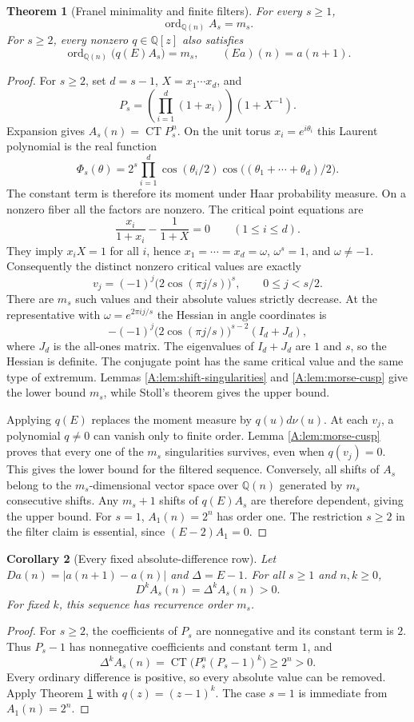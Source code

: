 \documentclass[11pt,a4paper]{article}
\newtheorem{theorem}{Theorem}[section]
\newtheorem{corollary}[theorem]{Corollary}
\theoremstyle{definition}
\theoremstyle{remark}
\numberwithin{equation}{section}
\DeclareMathOperator{\CT}{CT}
\newcommand{\Q}{\mathbb Q}\newcommand{\Z}{\mathbb Z}
\begin{document}
\begin{theorem}[Franel minimality and finite filters]\label{A:thm:franel-minimal}
For every $s\ge1$,
\[
 \operatorname{ord}_{\Q(n)} A_s=m_s.
\]
For $s\ge2$, every nonzero $q\in\Q[z]$ also satisfies
\[
 \operatorname{ord}_{\Q(n)}\bigl(q(E)A_s\bigr)=m_s,
 \qquad (Ea)(n)=a(n+1).
\]
\end{theorem}
\begin{proof}
For $s\ge2$, set $d=s-1$, $X=x_1\cdots x_d$, and
\[
 P_s=\left(\prod_{i=1}^d(1+x_i)\right)(1+X^{-1}).
\]
Expansion gives $A_s(n)=\CT P_s^n$. On the unit torus
$x_i=e^{i\theta_i}$ this Laurent polynomial is the real function
\[
 \Phi_s(\theta)=2^s\prod_{i=1}^d\cos(\theta_i/2)
     \cos\bigl((\theta_1+\cdots+\theta_d)/2\bigr).
\]
The constant term is therefore its moment under Haar probability
measure. On a nonzero fiber all the factors are nonzero. The critical
point equations are
\[
 \frac{x_i}{1+x_i}-\frac1{1+X}=0\qquad(1\le i\le d).
\]
They imply $x_iX=1$ for all $i$, hence
$x_1=\cdots=x_d=\omega$, $\omega^s=1$, and $\omega\ne-1$.
Consequently the distinct nonzero critical values are exactly
\[
 v_j=(-1)^j\bigl(2\cos(\pi j/s)\bigr)^s,
 \qquad 0\le j<s/2.
\]
There are $m_s$ such values and their absolute values strictly decrease.
At the representative with $\omega=e^{2\pi ij/s}$ the Hessian in
angle coordinates is
\[
 -(-1)^j\bigl(2\cos(\pi j/s)\bigr)^{s-2}(I_d+J_d),
\]
where $J_d$ is the all-ones matrix. The eigenvalues of $I_d+J_d$ are
$1$ and $s$, so the Hessian is definite. The conjugate point has the
same critical value and the same type of extremum. Lemmas
\ref{A:lem:shift-singularities} and \ref{A:lem:morse-cusp} give the lower
bound $m_s$, while Stoll's theorem gives the upper bound.

Applying $q(E)$ replaces the moment measure by $q(u)d\nu(u)$.
At each $v_j$, a polynomial $q\ne0$ can vanish only to finite order.
Lemma \ref{A:lem:morse-cusp} proves that every one of the $m_s$
singularities survives, even when $q(v_j)=0$. This gives the lower
bound for the filtered sequence. Conversely, all shifts of $A_s$
belong to the $m_s$-dimensional vector space over $\Q(n)$ generated
by $m_s$ consecutive shifts. Any $m_s+1$ shifts of $q(E)A_s$ are
therefore dependent, giving the upper bound. For $s=1$,
$A_1(n)=2^n$ has order one. The restriction $s\ge2$ in the filter
claim is essential, since $(E-2)A_1=0$.
\end{proof}

\begin{corollary}[Every fixed absolute-difference row]
Let $Da(n)=|a(n+1)-a(n)|$ and $\Delta=E-1$. For all
$s\ge1$ and $n,k\ge0$,
\[
 D^kA_s(n)=\Delta^kA_s(n)>0.
\]
For fixed $k$, this sequence has recurrence order $m_s$.
\end{corollary}
\begin{proof}
For $s\ge2$, the coefficients of $P_s$ are nonnegative and its constant
term is $2$. Thus $P_s-1$ has nonnegative coefficients and constant
term $1$, and
\[
 \Delta^kA_s(n)=\CT\bigl(P_s^n(P_s-1)^k\bigr)\ge2^n>0.
\]
Every ordinary difference is positive, so every absolute value can be
removed. Apply Theorem \ref{A:thm:franel-minimal} with $q(z)=(z-1)^k$.
The case $s=1$ is immediate from $A_1(n)=2^n$.
\end{proof}
\end{document}
